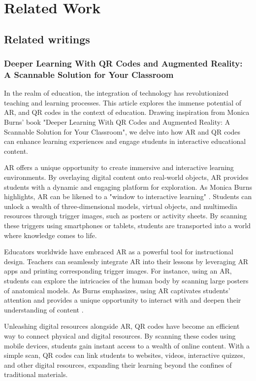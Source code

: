 \chapter{Related Work}\label{cap:relatedwork}
\section{Related writings}
\subsection*{Deeper Learning With QR Codes and Augmented Reality: A Scannable Solution for Your Classroom}

In the realm of education, the integration of technology has revolutionized teaching and learning processes. This article explores the immense potential of \ac{AR}, and \ac{QR} codes in the context of education. Drawing inspiration from Monica Burns' book "Deeper Learning With QR Codes and Augmented Reality: A Scannable Solution for Your Classroom", we delve into how \ac{AR} and \ac{QR} codes can enhance learning experiences and engage students in interactive educational content.

\ac{AR} offers a unique opportunity to create immersive and interactive learning environments. By overlaying digital content onto real-world objects, \ac{AR} provides students with a dynamic and engaging platform for exploration. As Monica Burns highlights, \ac{AR} can be likened to a "window to interactive learning" \cite{Burns2016}. Students can unlock a wealth of three-dimensional models, virtual objects, and multimedia resources through trigger images, such as posters or activity sheets. By scanning these triggers using smartphones or tablets, students are transported into a world where knowledge comes to life.

Educators worldwide have embraced \ac{AR} as a powerful tool for instructional design. Teachers can seamlessly integrate \ac{AR} into their lessons by leveraging \ac{AR} apps and printing corresponding trigger images. For instance, using an \acf{AR}, students can explore the intricacies of the human body by scanning large posters of anatomical models. As Burns emphasizes, using \ac{AR} captivates students' attention and provides a unique opportunity to interact with and deepen their understanding of content \cite{Burns2016}.

Unleashing digital resources alongside \ac{AR}, \ac{QR} codes have become an efficient way to connect physical and digital resources. By scanning these codes using mobile devices, students gain instant access to a wealth of online content. With a simple scan, \ac{QR} codes can link students to websites, videos, interactive quizzes, and other digital resources, expanding their learning beyond the confines of traditional materials.


